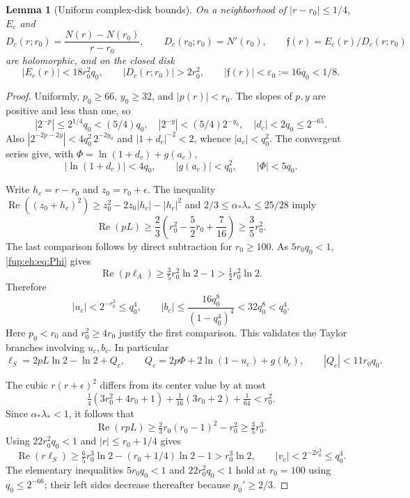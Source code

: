 \documentclass[11pt,letterpaper]{article}
\newtheorem{lemma}[theorem]{Lemma}
\theoremstyle{definition}\newtheorem{definition}[theorem]{Definition}
\theoremstyle{remark}\newtheorem{remark}[theorem]{Remark}
\begin{document}
\begin{lemma}[Uniform complex-disk bounds]\label{fup:eh:lem:disk}
On a neighborhood of $|r-r_0|\le1/4$, $E_c$ and
\[
 D_c(r;r_0)=\frac{N(r)-N(r_0)}{r-r_0},\qquad
 D_c(r_0;r_0)=N'(r_0),\qquad \mathfrak f(r)=E_c(r)/D_c(r;r_0)
\]
are holomorphic, and on the closed disk
\begin{equation}\label{fup:eh:eq:diskbounds}
 |E_c(r)|<18r_0^2q_0,\qquad |D_c(r;r_0)|>2r_0^2,\qquad
 |\mathfrak f(r)|<\varepsilon_0:=16q_0<1/8.
\end{equation}
\end{lemma}
\begin{proof}
Uniformly, $p_0\ge66$, $y_0\ge32$, and $|p(r)|<r_0$.
The slopes of $p,y$ are positive and less than one, so
\[
 |2^{-p}|\le2^{1/4}q_0<(5/4)q_0,\quad
 |2^{-y}|<(5/4)2^{-y_0},\quad |d_c|<2q_0\le2^{-65}.
\]
Also $|2^{-2p-2y}|<4q_0^2\,2^{-2y_0}$ and
$|1+d_c|^{-2}<2$, whence $|a_c|<q_0^2$.
The convergent series give, with $\Phi=\ln(1+d_c)+g(a_c)$,
\begin{equation}\label{fup:eh:eq:Phi}
 |\ln(1+d_c)|<4q_0,\qquad |g(a_c)|<q_0^2,\qquad
 |\Phi|<5q_0.
\end{equation}

Write $h_c=r-r_0$ and $z_0=r_0+\epsilon$. The inequality
$\operatorname{Re}((z_0+h_c)^2)\ge z_0^2-2z_0|h_c|-|h_c|^2$
and $2/3\le\alpha_*\lambda_*\le25/28$ imply
\[
 \operatorname{Re}(pL)\ge\frac23
 \left(r_0^2-\frac52r_0+\frac7{16}\right)\ge\frac35r_0^2.
\]
The last comparison follows by direct subtraction for $r_0\ge100$.
As $5r_0q_0<1$, \eqref{fup:eh:eq:Phi} gives
\[
 \operatorname{Re}(p\ell_A)\ge\tfrac35r_0^2\ln2-1
 >\tfrac12r_0^2\ln2.
\]
Therefore
\begin{equation}\label{fup:eh:eq:ubdisk}
 |u_c|<2^{-r_0^2}\le q_0^4,\qquad
 |b_c|\le\frac{16q_0^8}{(1-q_0^4)^4}<32q_0^8<q_0^4.
\end{equation}
Here $p_0<r_0$ and $r_0^2\ge4r_0$ justify the first comparison.
This validates the Taylor branches involving $u_c,b_c$. In particular
\[
 \ell_S=2pL\ln2-\ln2+Q_c,\qquad
 Q_c=2p\Phi+2\ln(1-u_c)+g(b_c),\qquad |Q_c|<11r_0q_0.
\]

The cubic $r(r+\epsilon)^2$ differs from its center value by at most
\[
 \tfrac14(3r_0^2+4r_0+1)+\tfrac1{16}(3r_0+2)+\tfrac1{64}<r_0^2.
\]
Since $\alpha_*\lambda_*<1$, it follows that
\[
 \operatorname{Re}(rpL)\ge\tfrac23r_0(r_0-1)^2-r_0^2
 \ge\tfrac35r_0^3.
\]
Using $22r_0^2q_0<1$ and $|r|\le r_0+1/4$ gives
\[
 \operatorname{Re}(r\ell_S)
 \ge\tfrac65r_0^3\ln2-(r_0+1/4)\ln2-1>r_0^3\ln2,
 \qquad |v_c|<2^{-2r_0^3}\le q_0^4.
\]
The elementary inequalities $5r_0q_0<1$ and $22r_0^2q_0<1$
hold at $r_0=100$ using $q_0\le2^{-66}$; their left sides
decrease thereafter because $p_0'\ge2/3$.


\end{proof}
\end{document}
